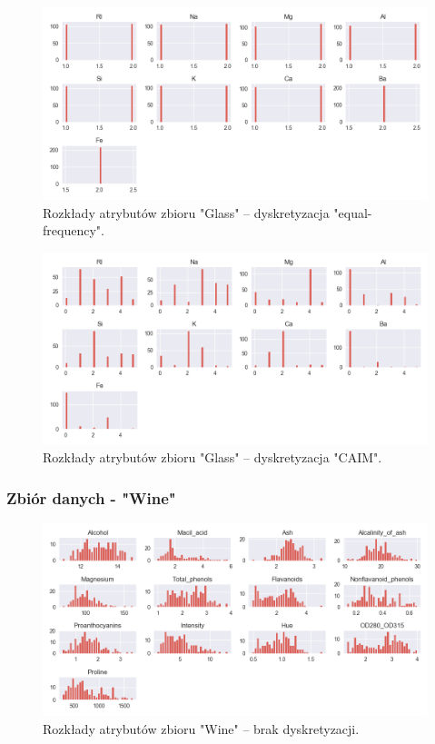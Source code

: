     \begin{figure}[H]
        \includegraphics[width=\textwidth]{img/discretization/ef_glass.png}
        \caption{Rozkłady atrybutów zbioru "Glass" -- dyskretyzacja "equal-frequency".}
    \end{figure}

    \begin{figure}[H]
        \includegraphics[width=\textwidth]{img/discretization/caim_glass.png}
        \caption{Rozkłady atrybutów zbioru "Glass" -- dyskretyzacja "CAIM".}
    \end{figure}
    
    
\subsubsection{Zbiór danych - "Wine"}
    \begin{figure}[H]
        \includegraphics[width=\textwidth]{img/discretization/non_discretized_wine.png}
        \caption{Rozkłady atrybutów zbioru "Wine" -- brak dyskretyzacji.}
    \end{figure}

